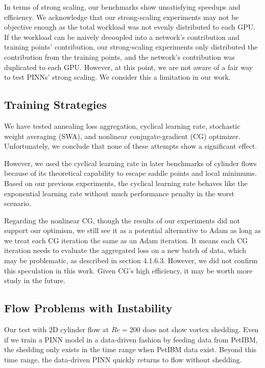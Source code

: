 In terms of strong scaling, our benchmarks show unsatisfying speedups and efficiency.
We acknowledge that our strong-scaling experiments may not be objective enough as the total workload was not evenly distributed to each GPU.
If the workload can be naively decoupled into a network's contribution and training points' contribution, our strong-scaling experiments only distributed the contribution from the training points, and the network's contribution was duplicated to each GPU.
However, at this point, we are not aware of a fair way to test PINNs' strong scaling.
We consider this a limitation in our work.

\subsection*{Training Strategies}

We have tested annealing loss aggregation, cyclical learning rate, stochastic weight averaging (SWA), and nonlinear conjugate-gradient (CG) optimizer.
Unfortunately, we conclude that none of these attempts show a significant effect.

However, we used the cyclical learning rate in later benchmarks of cylinder flows because of its theoretical capability to escape saddle points and local minimums.
Based on our previous experiments, the cyclical learning rate behaves like the exponential learning rate without much performance penalty in the worst scenario.

Regarding the nonlinear CG, though the results of our experiments did not support our optimism, we still see it as a potential alternative to Adam as long as we treat each CG iteration the same as an Adam iteration.
It means each CG iteration needs to evaluate the aggregated loss on a new batch of data, which may be problematic, as described in section 4.1.6.3. 
However, we did not confirm this speculation in this work.
Given CG's high efficiency, it may be worth more study in the future.

\subsection*{Flow Problems with Instability}

Our test with 2D cylinder flow at $Re=200$ does not show vortex shedding. 
Even if we train a PINN model in a data-driven fashion by feeding data from PetIBM, the shedding only exists in the time range when PetIBM data exist.
Beyond this time range, the data-driven PINN quickly returns to flow without shedding.

